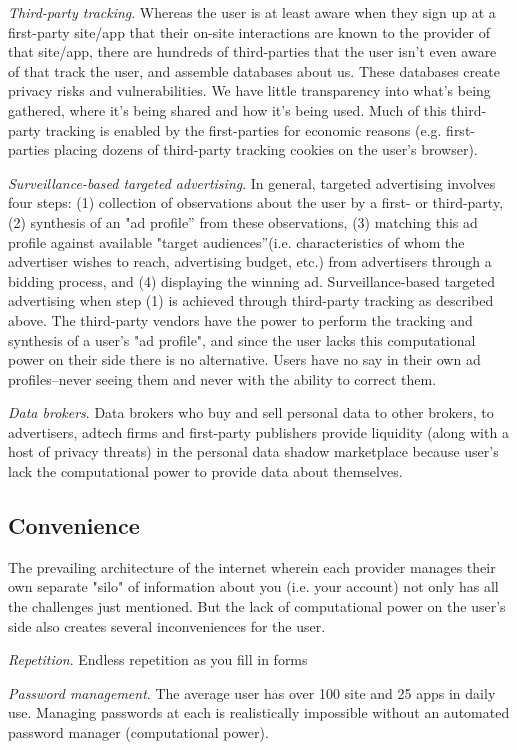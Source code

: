 \documentclass[11pt, oneside]{article}   	%
\begin{document}
\emph{Third-party tracking}. Whereas the user is at least aware when they sign up at a first-party site/app that their on-site interactions are known to the provider of that site/app, there are hundreds of third-parties that the user isn't even aware of that track the user, and assemble databases about us. These databases create privacy risks and vulnerabilities. We have little transparency into what's being gathered, where it's being shared and how it's being used. Much of this third-party tracking is enabled by the first-parties for economic reasons (e.g. first-parties placing dozens of third-party tracking cookies on the user's browser).

\emph{Surveillance-based targeted advertising}. In general, targeted advertising involves four steps: (1) collection of observations about the user by a first- or third-party, (2) synthesis of an "ad profile” from these observations, (3) matching this ad profile against available "target audiences”(i.e. characteristics of whom the advertiser wishes to reach, advertising budget, etc.) from advertisers through a bidding process, and (4) displaying the winning ad. Surveillance-based targeted advertising when step (1) is achieved through third-party tracking as described above. The third-party vendors have the power to perform the tracking and synthesis of a user's "ad profile", and since the user lacks this computational power on their side there is no alternative. Users have no say in their own ad profiles--never seeing them and never with the ability to correct them.

\emph{Data brokers}. Data brokers who buy and sell personal data to other brokers, to advertisers, adtech firms and first-party publishers provide liquidity (along with a host of privacy threats) in the personal data shadow marketplace because user's lack the computational power to provide data about themselves.

\subsection{Convenience}
The prevailing architecture of the internet wherein each provider manages their own separate "silo" of information about you (i.e. your account) not only has all the challenges just mentioned. But the lack of computational power on the user's side also creates several inconveniences for the user.

\emph{Repetition}. Endless repetition as you fill in forms

\emph{Password management}. The average user has over 100 site and 25 apps in daily use. Managing passwords at each is realistically impossible without an automated password manager (computational power). 
\end{document}
